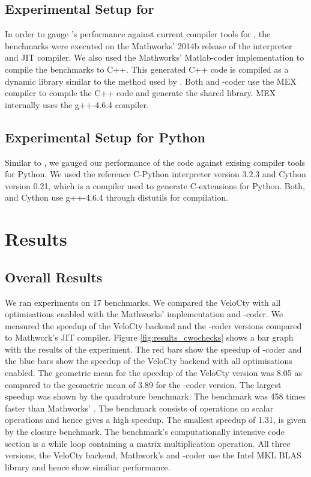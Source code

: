 \subsection{Experimental Setup for \matlab}
 In order to gauge \velocty's performance against current compiler tools for \matlab, the \matlab benchmarks were executed on the Mathworks' 2014b release of the \matlab interpreter and JIT compiler. We also used the Mathworks' Matlab-coder implementation to compile the benchmarks to C++. This generated C++ code is compiled as  a dynamic library similar to the method used by \velocty. Both \velocty and \matlab-coder use the MEX compiler to compile the C++ code and generate the shared library. MEX internally uses the g++-4.6.4 compiler. 
\subsection{Experimental Setup for Python}
 Similar to \matlab, we gauged our performance of the \velocty code against exising compiler tools for Python. We used the reference C-Python interpreter version 3.2.3  and Cython\cite{cython} version 0.21, which is a compiler used to generate C-extensions for Python. Both, \velocty and Cython use g++-4.6.4 through distutils for compilation. 

\section{\matlab Results}
\subsection{Overall Results}
We ran experiments on 17 \matlab benchmarks. We compared the VeloCty with all optimisations enabled  with the Mathworks' \matlab implementation and \matlab-coder. We measured the speedup of the VeloCty backend and the \matlab-coder versions compared to  Mathwork's \matlab JIT compiler. Figure \ref{fig:results_cwochecks} shows a bar graph with the results of the experiment. The red bars show the speedup of \matlab-coder and the blue bars show the speedup of the VeloCty backend with all optimisations enabled. The geometric mean for the speedup of the VeloCty version was 8.05 as compared to the geometric mean of 3.89 for the \matlab-coder version. The largest speedup was shown by the quadrature benchmark. The benchmark was 458 times faster than Mathworks' \matlab. The benchmark consists of operations on scalar operations and hence gives a high speedup. The smallest speedup of 1.31, is given by the closure benchmark. The benchmark's computationally intensive code section is a while loop containing a matrix multiplication operation. All three versions, the VeloCty backend, Mathwork's \matlab and \matlab-coder use the Intel MKL BLAS library and hence show similiar performance. 

